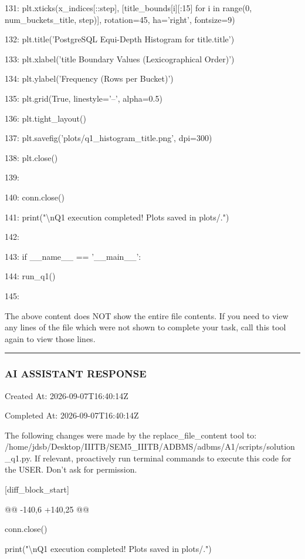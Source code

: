 \documentclass[11pt,a4paper]{article}
\begin{document}
131:         plt.xticks(x\_indices[::step], [title\_bounds[i][:15] for i in range(0, num\_buckets\_title, step)], rotation=45, ha='right', fontsize=9)

132:         plt.title('PostgreSQL Equi-Depth Histogram for title.title')

133:         plt.xlabel('title Boundary Values (Lexicographical Order)')

134:         plt.ylabel('Frequency (Rows per Bucket)')

135:         plt.grid(True, linestyle='--', alpha=0.5)

136:         plt.tight\_layout()

137:         plt.savefig('plots/q1\_histogram\_title.png', dpi=300)

138:         plt.close()

139:

140:     conn.close()

141:     print("\textbackslash{}nQ1 execution completed! Plots saved in plots/.")

142:

143: if \_\_name\_\_ == '\_\_main\_\_':

144:     run\_q1()

145:

The above content does NOT show the entire file contents. If you need to view any lines of the file which were not shown to complete your task, call this tool again to view those lines.


\hrule

\subsubsection{AI ASSISTANT RESPONSE}

Created At: 2026-09-07T16:40:14Z

Completed At: 2026-09-07T16:40:14Z

The following changes were made by the replace\_file\_content tool to: /home/jdsb/Desktop/IIITB/SEM5\_IIITB/ADBMS/adbms/A1/scripts/solution\_q1.py. If relevant, proactively run terminal commands to execute this code for the USER. Don't ask for permission.

[diff\_block\_start]

@@ -140,6 +140,25 @@

conn.close()

print("\textbackslash{}nQ1 execution completed! Plots saved in plots/.")
\end{document}
